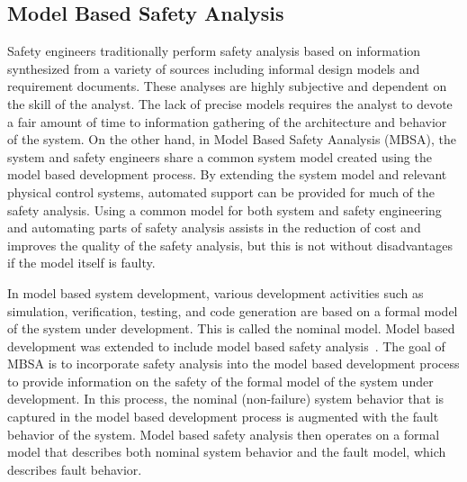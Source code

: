 \subsection{Model Based Safety Analysis}
\label{sec:mbsa}

Safety engineers traditionally perform safety analysis based on information synthesized from a variety of sources including informal design models and requirement documents. These analyses are highly subjective and dependent on the skill of the analyst. The lack of precise models requires the analyst to devote a fair amount of time to information gathering of the architecture and behavior of the system. On the other hand, in Model Based Safety Aanalysis (MBSA), the system and safety engineers share a common system model created using the model based development process. By extending the system model and relevant physical control systems, automated support can be provided for much of the safety analysis. Using a common model for both system and safety engineering and automating parts of safety analysis assists in the reduction of cost and improves the quality of the safety analysis, but this is not without disadvantages if the model itself is faulty. 

In model based system development, various development activities such as simulation, verification, testing, and code generation are based on a formal model of the system under development\cite{Joshi05:Dasc}. This is called the nominal model. Model based development was extended to include model based safety analysis~\cite{Joshi05:Dasc,Joshi05:SafeComp,Joshi07:Hase,DBLP:conf/cav/BozzanoCPJKPRT15,CAV2015:BoCiGrMa}. The goal of MBSA is to incorporate safety analysis into the model based development process to provide information on the safety of the formal model of the system under development. In this process, the nominal (non-failure) system behavior that is captured in the model based development process is augmented with the fault behavior of the system. Model based safety analysis then operates on a formal model that describes both nominal system behavior and the fault model, which describes fault behavior. 





